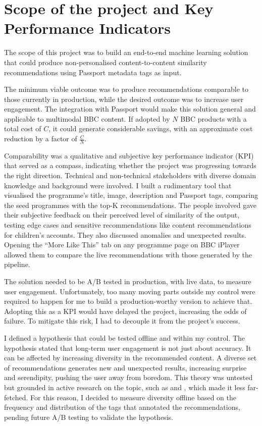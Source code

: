 
\section{Scope of the project and Key Performance Indicators}

The scope of this project was to build an end-to-end machine learning solution that could produce non-personalised
content-to-content similarity recommendations using Passport metadata tags as input.

The minimum viable outcome was to produce recommendations comparable to those currently in production,
while the desired outcome was to increase user engagement.
The integration with Passport would make this solution general and applicable to multimodal BBC content.
If adopted by $N$ BBC products with a total cost of $C$,
it could generate considerable savings, with an approximate cost reduction by a factor of $\frac{C}{N}$.

Comparability was a qualitative and subjective key performance indicator (KPI) that served as a compass,
indicating whether the project was progressing towards the right direction.
Technical and non-technical stakeholders with diverse domain knowledge and background were involved.
I built a rudimentary tool that visualised the programme's title, image, description and Passport tags,
comparing the seed programmes with the top-K recommendations.
The people involved gave their subjective feedback on their perceived level of similarity of the output,
testing edge cases and sensitive recommendations like content recommendations for children's accounts.
They also discussed anomalies and unexpected results.
Opening the ``More Like This'' tab on any programme page on BBC iPlayer allowed them to compare the live recommendations
with those generated by the pipeline.

The solution needed to be A/B tested in production, with live data, to measure user engagement.
Unfortunately, too many moving parts outside my control were required to happen for me to build a
production-worthy version to achieve that.
Adopting this as a KPI would have delayed the project, increasing the odds of failure.
To mitigate this risk, I had to decouple it from the project's success.

I defined a hypothesis that could be tested offline and within my control.
The hypothesis stated that long-term user engagement is not just about accuracy. It can be affected by increasing diversity in the recommended content.
A diverse set of recommendations generates new and unexpected results, increasing surprise and serendipity, pushing the user away from boredom.
This theory was untested but grounded in active research on the topic, such as \cite{Kaminskas2016DiversitySN} and
\cite{duricic2023beyondaccuracyreviewdiversityserendipity}, which made it less far-fetched.
For this reason, I decided to measure diversity offline based on the frequency and distribution of the tags that annotated the recommendations,
pending future A/B testing to validate the hypothesis.
